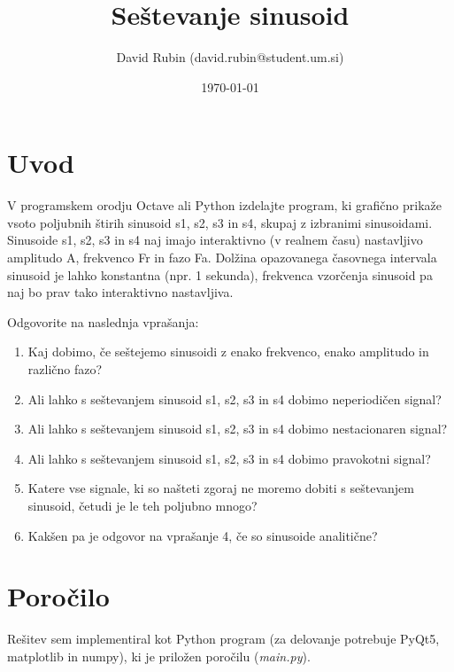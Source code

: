 \documentclass[a4paper,11pt]{article}
\title{Seštevanje sinusoid}
\author{David Rubin (david.rubin@student.um.si)}
\date{\today}
\begin{document}
\maketitle

\section{Uvod}

V programskem orodju Octave ali Python izdelajte program, ki grafično prikaže vsoto poljubnih štirih sinusoid s1, s2, s3 in s4, skupaj z izbranimi sinusoidami. Sinusoide s1, s2, s3 in s4  naj imajo interaktivno (v realnem času) nastavljivo amplitudo A, frekvenco Fr in fazo Fa. Dolžina opazovanega časovnega intervala sinusoid je lahko konstantna (npr. 1 sekunda), frekvenca vzorčenja sinusoid pa naj bo prav tako interaktivno nastavljiva.

Odgovorite na naslednja vprašanja:

\begin{enumerate}
	\item Kaj dobimo, če seštejemo sinusoidi z enako frekvenco, enako amplitudo in različno fazo?
	\item Ali lahko s seštevanjem sinusoid s1, s2, s3 in s4 dobimo neperiodičen signal?
	\item Ali lahko s seštevanjem sinusoid s1, s2,  s3 in s4 dobimo nestacionaren signal?
	\item Ali lahko s seštevanjem sinusoid s1, s2, s3 in s4 dobimo pravokotni signal?
	\item Katere vse signale, ki so našteti zgoraj ne moremo dobiti s seštevanjem sinusoid, četudi je le teh poljubno mnogo?
	\item Kakšen pa je odgovor na vprašanje 4, če so sinusoide analitične?


\end{enumerate}

\section{Poročilo}

Rešitev sem implementiral kot Python program (za delovanje potrebuje PyQt5, matplotlib in numpy), ki je priložen poročilu (\textit{main.py}).
\end{document}
